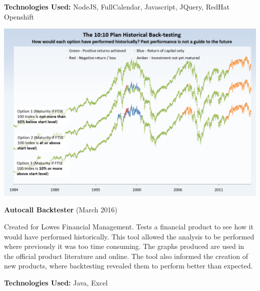 \documentclass[hidelinks, 12pt, a4paper]{article}
\begin{document}
\begin{minipage}{0.40\textwidth}
		\textbf{Technologies Used:} NodeJS, FullCalendar, Javascript, JQuery, RedHat Openshift
		
		\begin{center}
			\includegraphics[width=0.9\linewidth]{backtest.png}
		\end{center}
		\vspace{-12pt}
		\textbf{Autocall Backtester} (March 2016)
		
		Created for Lowes Financial Management. Tests a financial product to see how it would have performed historically. This tool allowed the analysis to be performed where previously it was too time consuming. The graphs produced are used in the official product literature and online. The tool also informed the creation of new products, where backtesting revealed them to perform better than expected.
		
		\textbf{Technologies Used:} Java, Excel
		
	\end{minipage}
	\hspace{0.02\textwidth}
\end{document}

